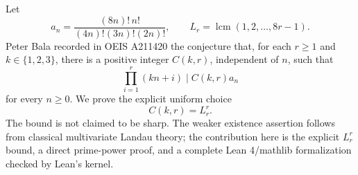 Let
\[
a_n=\frac{(8n)!\,n!}{(4n)!(3n)!(2n)!},
\qquad
L_r=\operatorname{lcm}(1,2,\ldots,8r-1).
\]
Peter Bala recorded in OEIS A211420 the conjecture that, for each
\(r\geq1\) and \(k\in\{1,2,3\}\), there is a positive integer
\(C(k,r)\), independent of \(n\), such that
\[
\prod_{i=1}^{r}(kn+i)\mid C(k,r)a_n
\]
for every \(n\geq0\). We prove the explicit uniform choice
\[
C(k,r)=L_r^r.
\]
The bound is not claimed to be sharp. The weaker existence assertion follows
from classical multivariate Landau theory; the contribution here is the
explicit \(L_r^r\) bound, a direct prime-power proof, and a complete Lean
4/mathlib formalization checked by Lean's kernel.
